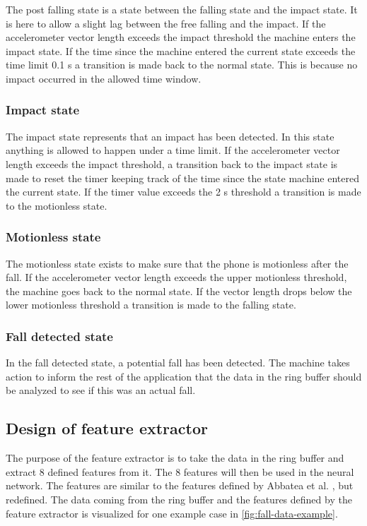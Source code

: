 \documentclass[12pt, a4paper, onecolumn]{article}
\begin{document}
	The post falling state is a state between the falling state and the impact state. It is here to allow a slight lag between the free falling and the impact. If the accelerometer vector length exceeds the impact threshold the machine enters the impact state. If the time since the machine entered the current state exceeds the time limit 0.1 s a transition is made back to the normal state. This is because no impact occurred in the allowed time window.
	
	\subsubsection{Impact state}
	
	The impact state represents that an impact has been detected. In this state anything is allowed to happen under a time limit. If the accelerometer vector length exceeds the impact threshold, a transition back to the impact state is made to reset the timer keeping track of the time since the state machine entered the current state. If the timer value exceeds the 2 s threshold a transition is made to the motionless state.
	
	\subsubsection{Motionless state}
	
	The motionless state exists to make sure that the phone is motionless after the fall. If the accelerometer vector length exceeds the upper motionless threshold, the machine goes back to the normal state. If the vector length drops below the lower motionless threshold a transition is made to the falling state.
	
	\subsubsection{Fall detected state}
	
	In the fall detected state, a potential fall has been detected. The machine takes action to inform the rest of the application that the data in the ring buffer should be analyzed to see if this was an actual fall.
	
	\subsection{Design of feature extractor}
	
	The purpose of the feature extractor is to take the data in the ring buffer and extract 8 defined features from it. The 8 features will then be used in the neural network. The features are similar to the features defined by Abbatea et al. \cite{piza_uni}, but redefined. The data coming from the ring buffer and the features defined by the feature extractor is visualized for one example case in \ref{fig:fall-data-example}.
	
\end{document}

